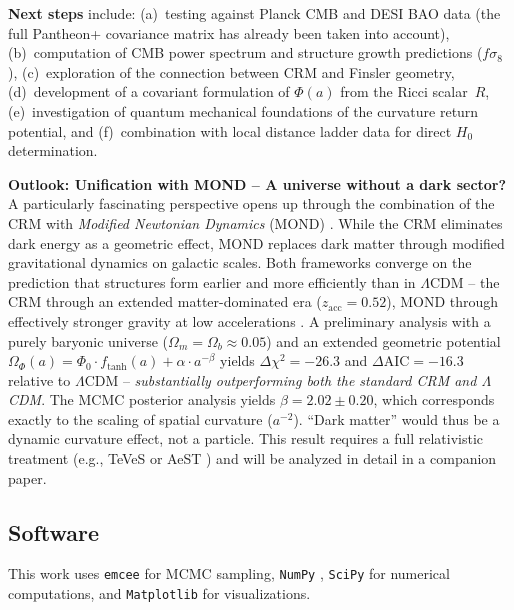 \documentclass[aps,prd,twocolumn,superscriptaddress,nofootinbib]{revtex4-2}
\begin{document}
\textbf{Next steps} include: (a)~testing against Planck CMB and DESI BAO data (the full Pantheon+ covariance matrix has already been taken into account), (b)~computation of CMB power spectrum and structure growth predictions ($f\sigma_8$), (c)~exploration of the connection between CRM and Finsler geometry, (d)~development of a covariant formulation of $\Phi(a)$ from the Ricci scalar~$R$, (e)~investigation of quantum mechanical foundations of the curvature return potential, and (f)~combination with local distance ladder data for direct $H_0$ determination.

\textbf{Outlook: Unification with MOND -- A universe without a dark sector?} A particularly fascinating perspective opens up through the combination of the CRM with \textit{Modified Newtonian Dynamics} (MOND) \cite{Milgrom1983}. While the CRM eliminates dark energy as a geometric effect, MOND replaces dark matter through modified gravitational dynamics on galactic scales. Both frameworks converge on the prediction that structures form earlier and more efficiently than in $\Lambda$CDM -- the CRM through an extended matter-dominated era ($z_{\mathrm{acc}} = 0.52$), MOND through effectively stronger gravity at low accelerations \cite{Asencio2023}. A preliminary analysis with a purely baryonic universe ($\Omega_m = \Omega_b \approx 0.05$) and an extended geometric potential $\Omega_\Phi(a) = \Phi_0 \cdot f_{\mathrm{tanh}}(a) + \alpha \cdot a^{-\beta}$ yields $\Delta\chi^2 = -26.3$ and $\Delta\mathrm{AIC} = -16.3$ relative to $\Lambda$CDM -- \textit{substantially outperforming both the standard CRM and $\Lambda$CDM}. The MCMC posterior analysis yields $\beta = 2.02 \pm 0.20$, which corresponds exactly to the scaling of spatial curvature ($a^{-2}$). ``Dark matter'' would thus be a dynamic curvature effect, not a particle. This result requires a full relativistic treatment (e.g., TeVeS or AeST \cite{Bekenstein2004,Skordis2021}) and will be analyzed in detail in a companion paper.

\subsection*{Software}

This work uses \texttt{emcee} \cite{ForemanMackey2013} for MCMC sampling, \texttt{NumPy} \cite{Harris2020}, \texttt{SciPy} \cite{Virtanen2020} for numerical computations, and \texttt{Matplotlib} \cite{Hunter2007} for visualizations.
\end{document}
